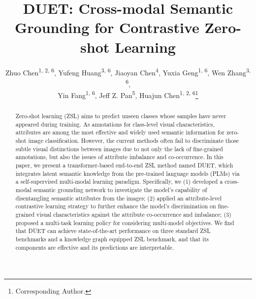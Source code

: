 \documentclass[letterpaper]{article} \usepackage{aaai23}  \usepackage{times}  \usepackage{helvet}  \usepackage{courier}  \usepackage[hyphens]{url}  \usepackage{graphicx} \urlstyle{rm} \def\UrlFont{\rm}  \usepackage{natbib}  \usepackage{caption} \frenchspacing  \setlength{\pdfpagewidth}{8.5in}  \setlength{\pdfpageheight}{11in}  \usepackage{algorithm}
\title{DUET: Cross-modal Semantic Grounding for Contrastive Zero-shot Learning}
\author{
	Zhuo Chen\textsuperscript{\rm 1, 2, 6}, Yufeng Huang\textsuperscript{\rm 3, 6}, Jiaoyan Chen\textsuperscript{\rm 4}, Yuxia Geng\textsuperscript{\rm 1, 6}, Wen Zhang\textsuperscript{\rm 3, 6}, \\ Yin Fang\textsuperscript{\rm 1, 6}, Jeff Z. Pan\textsuperscript{\rm 5}, Huajun Chen\textsuperscript{\rm 1, 2, 6}\thanks{Corresponding Author.}
}
\newcommand{\wen}[1]{{\color{black}#1}}
\newcommand{\fy}[1]{{\color{black}#1}}
\begin{document}
\maketitle

\begin{abstract}
Zero-shot learning (ZSL) aims to predict 
\wen{unseen}
classes whose {samples} have never appeared during training. 
As annotations for class-level visual characteristics, attributes are among the {most} effective and widely used semantic information for zero-shot image classification. 
However, the current methods often fail to discriminate those subtle visual distinctions between images due to not only the lack 
 of fine-grained annotations, but also the issues of attribute imbalance and co-occurrence.  
In this paper, we present a transformer-based {end-to-end ZSL method named DUET,} 
which integrates latent semantic knowledge from the pre-trained language models (PLMs) 
{via} a self-supervised multi-modal {learning} paradigm.
Specifically, {we} \wen{(1)} develop{ed} \fy{a} cross-modal semantic grounding network to 
\fy{investigate the model's} capability of disentangling semantic attribute\fy{s} from the images;
\wen{(2)} appl{ied} an attribute-level contrastive learning strategy to further enhance the model's \fy{discrimination} on fine-grained visual characteristics against the attribute co-occurrence and imbalance; 
{ (3) {proposed} a multi-task learning policy for considering multi-model objectives.}
We find that   DUET can achieve state-of-the-art performance on three standard ZSL benchmarks and a knowledge graph equipped ZSL benchmark, and that its components are effective and its predictions are interpretable. 

\end{abstract}

\graphicspath{ {figures/} }
\end{document}
